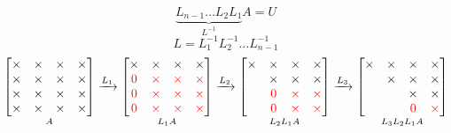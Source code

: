 \documentclass[a4paper]{article}
\begin{document}
\begin{equation*}
    \underbrace{L_{n-1}\dots L_2 L_1}_{L^{-1}}A=U
\end{equation*}
\begin{equation*}
    L=L_1^{-1}L_2^{-1} \dots L_{n-1}^{-1}
\end{equation*}
\begin{equation*}
    \underset{A}{
    \begin{bmatrix}
        \times & \times & \times & \times \\
        \times & \times & \times & \times \\
        \times & \times & \times & \times \\
        \times & \times & \times & \times \\
    \end{bmatrix}}
    \xrightarrow{L_1}
    \underset{L_1A}{
    \begin{bmatrix}
        \times & \times & \times & \times \\
        \textcolor{red}{0} & \textcolor{red}{\times} & \textcolor{red}{\times} & \textcolor{red}{\times} \\
        \textcolor{red}{0} & \textcolor{red}{\times} & \textcolor{red}{\times} & \textcolor{red}{\times} \\
        \textcolor{red}{0} & \textcolor{red}{\times} & \textcolor{red}{\times} & \textcolor{red}{\times} \\
    \end{bmatrix}}  
    \xrightarrow{L_2}
    \underset{L_2L_1A}{
    \begin{bmatrix}
        \times & \times & \times & \times \\
         & \times & \times & \times \\
         & \textcolor{red}{0} & \textcolor{red}{\times} & \textcolor{red}{\times} \\
         & \textcolor{red}{0} & \textcolor{red}{\times} & \textcolor{red}{\times} \\
    \end{bmatrix}}
    \xrightarrow{L_3}
    \underset{L_3L_2L_1A}{
    \begin{bmatrix}
        \times & \times & \times & \times \\
         & \times & \times & \times \\
         & & \times & \times \\
         & & \textcolor{red}{0} & \textcolor{red}{\times} \\
    \end{bmatrix}}
\end{equation*}
\end{document}
